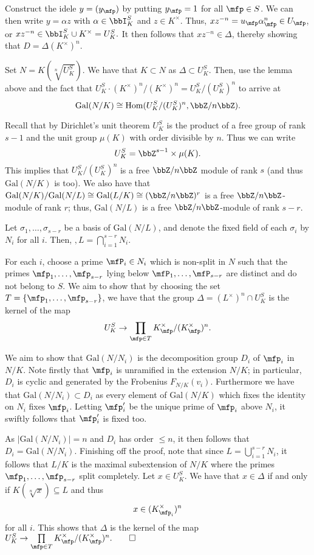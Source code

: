 \documentclass[a4paper, 12pt,oneside,openany]{book}
\begin{document}
Construct the idele $y=(y_\mfp)$ by putting $y_\mfp=1$ for all $\mfp \in S$. We can then write $y=\alpha z$ with $\alpha \in \bbI_K^S$ and $z \in K^\times$. Thus, $xz^{-n} = u_\mfp \alpha_\mfp^n \in U_\mfp$, or $xz^{-n} \in \bbI_K^S \cup K^\times = U_K^S.$ It then follows that $xz^{-n} \in \Delta$, thereby showing that $D = \Delta (K^\times)^n$.

Set $N=K(\sqrt[n]{U_K^S})$. We have that $K \subset N$ as $\Delta \subset U_K^S$. Then, use the lemma above and the fact that $U_K^S\cdot (K^\times)^n / (K^\times)^n = U_K^S / (U_K^S)^n$ to arrive at $$\text{Gal}(N/K) \cong \text{Hom}(U_K^S/(U_K^S)^n, \bbZ/n\bbZ).$$

Recall that by Dirichlet's unit theorem $U_K^S$ is the product of a free group of rank $s-1$ and the unit group $\mu(K)$ with order divisible by $n$. Thus we can write $$U_K^S = \bbZ^{s-1} \times \mu(K).$$ This implies that $U_K^S / (U_K^S)^n$ is a free $\bbZ/n\bbZ$ module of rank $s$ (and thus $\text{Gal}(N/K)$ is too). We also have that $\text{Gal}(N/K)/\text{Gal}(N/L) \cong \text{Gal}(L/K) \cong (\bbZ/n\bbZ)^r$ is a free $\bbZ/n\bbZ$-module of rank $r$; thus, $\text{Gal}(N/L)$ is a free $\bbZ/n\bbZ$-module of rank $s-r$.

Let $\sigma_1, \dots, \sigma_{s-r}$ be a basis of $\text{Gal}(N/L)$, and denote the fixed field of each $\sigma_i$ by $N_i$ for all $i$. Then, $,L = \bigcap\limits_{i=1}^{s-r}N_i.$ 

For each $i$, choose a prime $\mfP_i \in N_i$ which is non-split in $N$ such that the primes $\mfp_1, \dots, \mfp_{s-r}$ lying below $\mfP_1, \dots, \mfP_{s-r}$ are distinct and do not belong to $S$. We aim to show that by choosing the set $T = \{\mfp_1, \dots, \mfp_{s-r}\}$, we have that the group $\Delta = (L^\times)^n \cap U_K^S$ is the kernel of the map $$U_K^S \to \prod\limits_{\mfp \in T} K_\mfp^\times / (K_\mfp^\times)^n.$$

We aim to show that $\text{Gal}(N/N_i)$ is the decomposition group $D_i$ of $\mfp_i$ in $N/K$. Note firstly that $\mfp_i$ is unramified in the extension $N/K$; in particular, $D_i$ is cyclic and generated by the Frobenius $F_{N/K}(v_i)$. Furthermore we have that $\text{Gal}(N/N_i) \subset D_i$ as every element of $\text{Gal}(N/K)$ which fixes the identity on $N_i$ fixes $\mfp_i$. Letting $\mfp_i'$ be the unique prime of $\mfp_i$ above $N_i$, it swiftly follows that $\mfp_i'$ is fixed too.

As $|\text{Gal}(N/N_i)|=n$ and $D_i$ has order $\leq n$, it then follows that $D_i = \text{Gal}(N/N_i)$. Finishing off the proof, note that since $L= \bigcup\limits_{i=1}^{s-r} N_i$, it follows that $L/K$ is the maximal subextension of $N/K$ where the primes $\mfp_1, \dots, \mfp_{s-r}$ split completely. Let $x \in U_K^S.$ We have that $x \in \Delta$ if and only if $K(\sqrt[n]{x}) \subseteq L$ and thus $$x \in (K_{\mfp_i}^\times)^n$$ for all $i$. This shows that $\Delta$ is the kernel of the map $U_K^S \to \prod\limits_{\mfp \in T} K_\mfp^\times / (K_\mfp^\times)^n. \qed$
\end{document}
